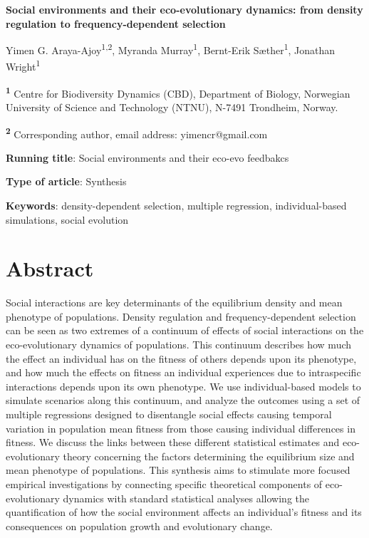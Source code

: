 \documentclass{article}
\begin{document}
\begin{center}
\large
\textbf{Social environments and their eco-evolutionary dynamics: from density regulation to frequency-dependent selection}
\end{center}

\begin{center}
	Yimen G. Araya-Ajoy\textsuperscript{1,2}, Myranda Murray\textsuperscript{1},  Bernt-Erik Sæther\textsuperscript{1}, Jonathan Wright\textsuperscript{1}
\end{center}

\bigskip
\noindent \textsuperscript{\textbf{1}} Centre for Biodiversity Dynamics (CBD), Department of Biology, Norwegian University of Science and Technology (NTNU), N-7491 Trondheim, Norway.

\noindent \textsuperscript{\textbf{2}} Corresponding author, email address: yimencr@gmail.com

\bigskip
\noindent \textbf{Running title}:  Social environments and their eco-evo feedbakcs

\bigskip
\noindent \textbf{Type of article}: Synthesis

\bigskip
\noindent \textbf{Keywords}: density-dependent selection, multiple regression, individual-based simulations, social evolution


\newpage
\section{Abstract}
Social interactions are key determinants of the equilibrium density and mean phenotype of populations. Density regulation and frequency-dependent selection can be seen as two extremes of a continuum of effects of social interactions on the eco-evolutionary dynamics of populations. This continuum  describes how much the effect an individual has on the fitness of others depends upon its phenotype, and how much the effects on fitness an individual experiences due to intraspecific interactions depends upon its own phenotype. We use individual-based models to simulate scenarios along this continuum, and analyze the outcomes using a set of multiple regressions designed to disentangle social effects causing temporal variation in population mean fitness from those causing individual differences in fitness. We discuss the links between these different statistical estimates and eco-evolutionary theory concerning the factors determining the equilibrium size and mean phenotype of populations. This synthesis aims to stimulate more focused empirical investigations by connecting specific theoretical components of eco-evolutionary dynamics with standard statistical analyses allowing the quantification of how the social environment affects an individual's fitness and its consequences on population growth and evolutionary change. 
\end{document}
